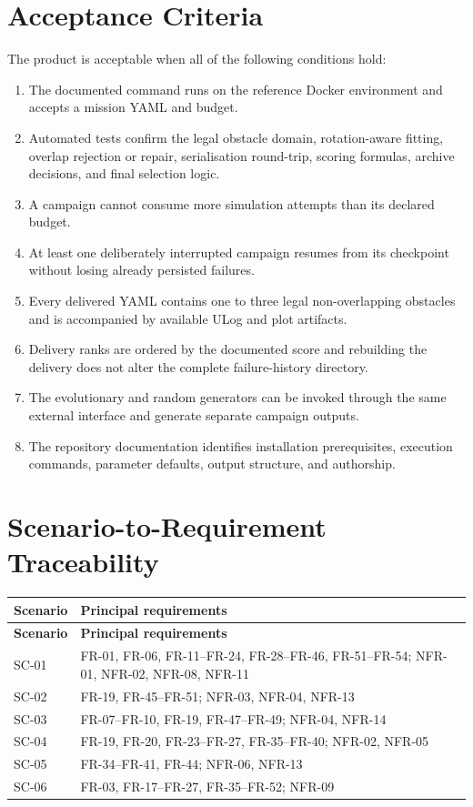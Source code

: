 \documentclass[11pt,a4paper]{report}
\begin{document}
\section{Acceptance Criteria}
The product is acceptable when all of the following conditions hold:
\begin{enumerate}
  \item The documented command runs on the reference Docker environment and accepts a mission YAML and budget.
  \item Automated tests confirm the legal obstacle domain, rotation-aware fitting, overlap rejection or repair, serialisation round-trip, scoring formulas, archive decisions, and final selection logic.
  \item A campaign cannot consume more simulation attempts than its declared budget.
  \item At least one deliberately interrupted campaign resumes from its checkpoint without losing already persisted failures.
  \item Every delivered YAML contains one to three legal non-overlapping obstacles and is accompanied by available ULog and plot artifacts.
  \item Delivery ranks are ordered by the documented score and rebuilding the delivery does not alter the complete failure-history directory.
  \item The evolutionary and random generators can be invoked through the same external interface and generate separate campaign outputs.
  \item The repository documentation identifies installation prerequisites, execution commands, parameter defaults, output structure, and authorship.
\end{enumerate}

\section{Scenario-to-Requirement Traceability}
\begin{longtable}{L{2cm} L{12.8cm}}
\toprule
\textbf{Scenario} & \textbf{Principal requirements}\\
\midrule
\endfirsthead
\toprule
\textbf{Scenario} & \textbf{Principal requirements}\\
\midrule
\endhead
SC-01 & FR-01, FR-06, FR-11--FR-24, FR-28--FR-46, FR-51--FR-54; NFR-01, NFR-02, NFR-08, NFR-11\\
SC-02 & FR-19, FR-45--FR-51; NFR-03, NFR-04, NFR-13\\
SC-03 & FR-07--FR-10, FR-19, FR-47--FR-49; NFR-04, NFR-14\\
SC-04 & FR-19, FR-20, FR-23--FR-27, FR-35--FR-40; NFR-02, NFR-05\\
SC-05 & FR-34--FR-41, FR-44; NFR-06, NFR-13\\
SC-06 & FR-03, FR-17--FR-27, FR-35--FR-52; NFR-09\\
\bottomrule
\end{longtable}
\end{document}
